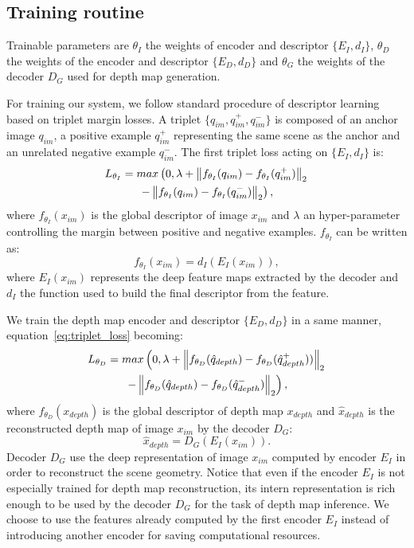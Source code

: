 \subsection{Training routine}
\label{subsec:training}
Trainable parameters are $\theta_{I}$ the weights of encoder and descriptor $\{E_I, d_I\}$, $\theta_{D}$ the weights of the encoder and descriptor $\{E_D, d_D\}$ and $\theta_{G}$ the weights of the decoder $D_G$ used for depth map generation. 

For training our system, we follow standard procedure of descriptor learning based on triplet margin losses. A triplet $\{q_{im}, q_{im}^+, q_{im}^-\}$ is composed of an anchor image $q_{im}$, a positive example $q_{im}^+$ representing the same scene as the anchor and an unrelated negative example $q_{im}^-$.
The first triplet loss acting on $\{E_I, d_I\}$ is:
\begin{multline}
	\label{eq:triplet_loss}
	L_{\theta_{I}} = max\left(0, \lambda + \left\lVert f_{\theta_{I}}(q_{im}) - f_{\theta_{I}}(q_{im}^+)\right\rVert_2  \right. \\	
	\left. - \left\lVert f_{\theta_{I}}(q_{im}) - f_{\theta_{I}}(q_{im}^-)\right\rVert_2 \right),
\end{multline}
where $f_{\theta_{I}}(x_{im})$ is the global descriptor of image $x_{im}$ and $\lambda$ an hyper-parameter controlling the margin between positive and negative examples. $f_{\theta_{I}}$ can be written as:
\begin{equation}
	\label{eq:desc_details}
	f_{\theta_{I}}(x_{im}) = d_I(E_I(x_{im})),
\end{equation}
where $E_I(x_{im})$ represents the deep feature maps extracted by the decoder and $d_I$ the function used to build the final descriptor from the feature.

We train the depth map encoder and descriptor $\{E_D, d_D\}$ in a same manner, equation~\ref{eq:triplet_loss} becoming:
\begin{multline}
	\label{eq:depth_triplet_loss}
	L_{\theta_{D}}  = max\left(0, \lambda + \left\lVert f_{\theta_{D}}(\hat{q}_{depth}) - f_{\theta_{D}}(\hat{q}_{depth}^+))\right\rVert_2  \right. \\	
	\left. - \left\lVert f_{\theta_{D}}(\hat{q}_{depth}) - f_{\theta_{D}}(\hat{q}_{depth}^-)\right\rVert_2 \right),
\end{multline}
where $f_{\theta_{D}}(x_{depth})$ is the global descriptor of depth map $x_{depth}$ and $\hat{x}_{depth}$ is the reconstructed depth map of image $x_{im}$ by the decoder $D_G$:
\begin{equation}
	\label{eq:generator}
	\hat{x}_{depth} = D_G(E_I(x_{im})).
\end{equation}
Decoder $D_G$ use the deep representation of image $x_{im}$ computed by encoder $E_I$ in order to reconstruct the scene geometry. Notice that even if the encoder $E_I$ is not especially trained for depth map reconstruction, its intern representation is rich enough to be used by the decoder $D_G$ for the task of depth map inference. We choose to use the features already computed by the first encoder $E_I$ instead of introducing another encoder for saving computational resources.

